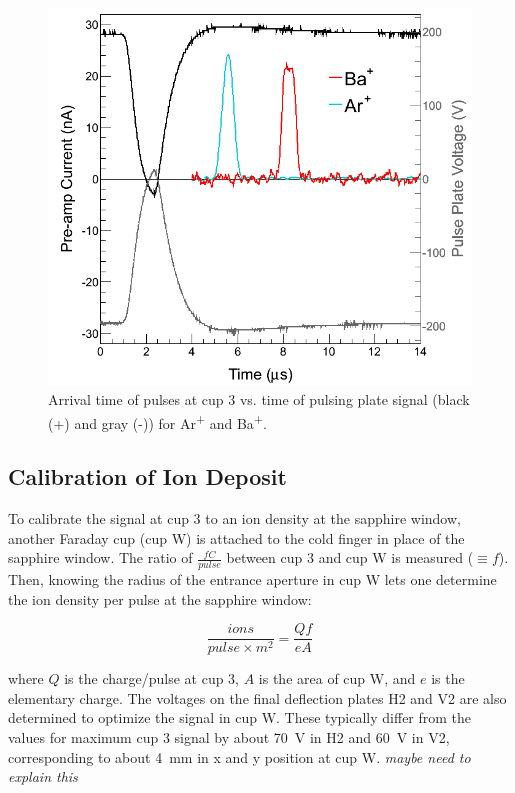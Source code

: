 \begin{figure}[h]
        \centering
                \includegraphics[width=.7\textwidth]{figures/pulses_BaAr.png}
                \caption{Arrival time of pulses at cup 3 vs. time of pulsing plate signal (black (+) and gray (-)) for Ar\textsuperscript{+} and Ba\textsuperscript{+}.}
\label{fig:pulses_ArBa}
\end{figure}

\subsection{Calibration of Ion Deposit}
\label{subsec:ionDepCal}

To calibrate the signal at cup 3 to an ion density at the sapphire window, another Faraday cup (cup W) is attached to the cold finger in place of the sapphire window.  The ratio of $\frac{fC}{pulse}$ between cup 3 and cup W is measured ($\equiv f$).  Then, knowing the radius of the entrance aperture in cup W lets one determine the ion density per pulse at the sapphire window:

\begin{equation}
\frac{ions}{pulse \times m^{2}} = \frac{Q f}{e A}
\label{eqn:ion_density}
\end{equation}

\noindent
where $Q$ is the charge/pulse at cup 3, $A$ is the area of cup W, and $e$ is the elementary charge.  The voltages on the final deflection plates H2 and V2 are also determined to optimize the signal in cup W.  These typically differ from the values for maximum cup 3 signal by about 70~V in H2 and 60~V in V2, corresponding to about 4~mm in x and y position at cup W. \emph{\color{gray}maybe need to explain this}

